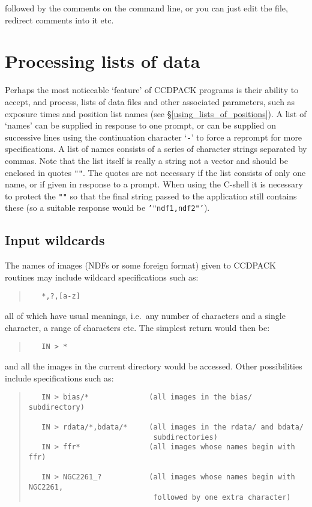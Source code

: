\documentclass[twoside,11pt]{article}
\newcommand{\hyperref}[4]{#2\ref{#4}#3}
\newcommand{\xlabel}[1]{}
\renewcommand{\_}{\texttt{\symbol{95}}}
\newenvironment{myquote}{\begin{quote}\begin{small}}{\end{small}\end{quote}}
\newcommand{\text}[1]{{\small \tt #1}}
\begin{document}
followed by the comments on the command line, or you can just edit the
file, redirect comments into it etc.

\section{Processing lists of data \label{ndflists} \xlabel{ndflists}}

Perhaps the most noticeable `feature' of CCDPACK programs is their ability to
accept, and process, lists of data files and other associated parameters,
such as exposure times and position list names (see
\hyperref{``using lists of positions''}{\S}{}{using_lists_of_positions}).
A list of `names' can be supplied in
response to one prompt, or can be supplied on successive lines using the
continuation character `\text{-}' to force a reprompt for more
specifications. A list of names consists of a series of character
strings separated by commas. Note that the list itself is really a
string not a vector and should be enclosed in quotes \text{""}.
The quotes are not necessary if the list consists of only one name, or if
given in response to a prompt. When using the C-shell it is necessary to
protect the \text{""} so that the final string passed to the application
still contains these (so a suitable response would be \text{'"ndf1,ndf2"'}).

\subsection{Input wildcards}
The names of images (NDFs or some foreign format) given to CCDPACK
routines may include wildcard specifications such as:
\begin{myquote}
\begin{verbatim}
   *,?,[a-z]
\end{verbatim}
\end{myquote}
all of which have usual meanings, i.e.\ any number of characters and a
single character, a range of characters etc.
The simplest return would then be:
\begin{myquote}
\begin{verbatim}
   IN > *
\end{verbatim}
\end{myquote}
and all the images in the current directory would be accessed. Other
possibilities include specifications such as:
\begin{myquote}
\begin{verbatim}
   IN > bias/*              (all images in the bias/ subdirectory)

   IN > rdata/*,bdata/*     (all images in the rdata/ and bdata/
                             subdirectories)
   IN > ffr*                (all images whose names begin with ffr)

   IN > NGC2261_?           (all images whose names begin with NGC2261,
                             followed by one extra character)
\end{verbatim}
\end{myquote}
\end{document}
